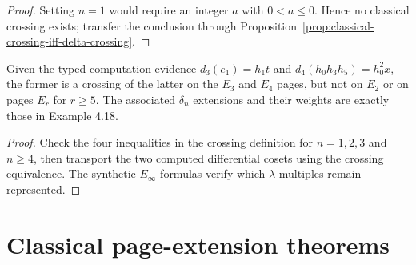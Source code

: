 \begin{proof}
  Setting $n=1$ would require an integer $a$ with $0<a\le0$.  Hence no
  classical crossing exists; transfer the conclusion through
  Proposition~\ref{prop:classical-crossing-iff-delta-crossing}.
\end{proof}

\begin{proposition}
  \label{prop:stem38-crossing-regression}
  \notready
  Given the typed computation evidence
  $d_3(e_1)=h_1t$ and
  $d_4(h_0h_3h_5)=h_0^2x$, the former is a crossing of the latter on the
  $E_3$ and $E_4$ pages, but not on $E_2$ or on pages $E_r$ for $r\ge5$.
  The associated $\delta_n$ extensions and their weights are exactly those in
  Example 4.18.
\end{proposition}

\begin{proof}
  Check the four inequalities in the crossing definition for $n=1,2,3$ and
  $n\ge4$, then transport the two computed differential cosets using the
  crossing equivalence.  The synthetic $E_\infty$ formulas verify which
  $\lambda$ multiples remain represented.
\end{proof}

\section{Classical page-extension theorems}

